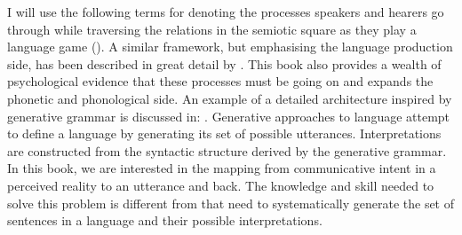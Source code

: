 I will use the following terms for denoting the 
processes speakers and hearers go through while traversing
the relations in the semiotic square as they play a language
game (). 
A similar framework, but emphasising the 
language production side, has been described in great
detail by \cite{Levelt:1989}. This book also provides a wealth
of psychological evidence that these processes must 
be going on and expands the phonetic and phonological 
side. An example of a detailed architecture inspired by 
generative grammar is discussed in: \cite{Jackendoff:1997}. 
Generative approaches to language attempt to define a language by 
generating its set of possible utterances. Interpretations
are constructed from the syntactic structure derived by 
the generative grammar. In this book, we are interested 
in the mapping from communicative intent 
in a perceived reality to an utterance and back. The knowledge
and skill needed to solve this problem is different from 
that need to systematically generate the set of sentences in a 
language and their possible interpretations.
